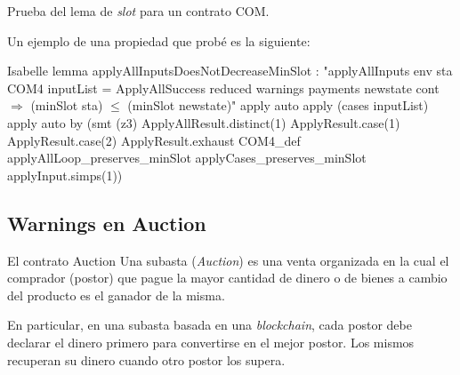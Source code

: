 \documentclass{beamer}
\begin{document}
\begin{frame}[fragile]{Prueba del lema de \textit{slot} para un contrato COM.}

Un ejemplo de una propiedad que probé es la siguiente:

\begin{code}{Isabelle}
lemma applyAllInputsDoesNotDecreaseMinSlot :
"applyAllInputs env sta COM4 inputList = 
    ApplyAllSuccess reduced warnings payments newstate cont $\Longrightarrow$
  (minSlot sta) $\leq$ (minSlot newstate)"
  apply auto
  apply (cases inputList)
  apply auto 
  by (smt (z3) ApplyAllResult.distinct(1)
                  ApplyResult.case(1)
                  ApplyResult.case(2)
                  ApplyResult.exhaust
                  COM4_def
                  applyAllLoop_preserves_minSlot
                  applyCases_preserves_minSlot applyInput.simps(1))
\end{code}

\end{frame}

\subsection{Warnings en Auction}

\begin{frame}{El contrato Auction}
Una subasta (\textit{Auction}) es una venta organizada en la cual el comprador (postor) que pague la mayor cantidad de dinero o de bienes a cambio del producto es el ganador de la misma.

\vfill
\pause

En particular, en una subasta basada en una \textit{blockchain}, cada postor debe declarar el dinero primero para convertirse en el mejor postor. Los mismos recuperan su dinero cuando otro postor los supera.


\end{frame}
\end{document}
